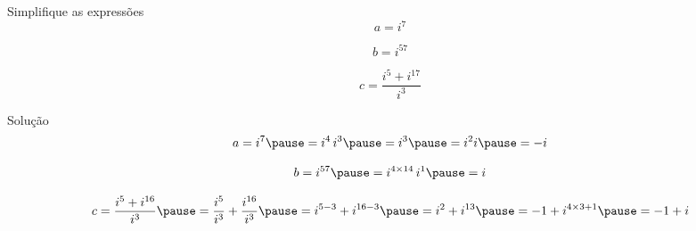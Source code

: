 \begin{question}
  Simplifique as expressões
  \[
    a = i^7
  \]

  \[
    b = i^{57}
  \]

  \[
    c = \frac{i^5 + i^{17}}{i^3}
  \]
\end{question}

\begin{resolution}{Solução}
  \[
    a
    = i^7
    \pause
    = i^4 \, i^3
    \pause
    = i^3
    \pause
    = i^2 i
    \pause
    = -i
  \]

  \pause
  \vspace{0.5\baselineskip}
  \[
    b
    = i^{57}
    \pause
    = i^{4\times 14} \, i^1
    \pause
    = i
  \]

  \pause
  \vspace{0.5\baselineskip}
  \[
    c
    = \frac{i^5 + i^{16}}{i^3}
    \pause
    = \frac{i^5}{i^3} + \frac{i^{16}}{i^3}
    \pause
    = i^{5-3} + i^{16-3}
    \pause
    = i^2 + i^{13}
    \pause
    = -1 + i^{4\times 3+1}
    \pause
    = -1 + i
  \]
\end{resolution}

